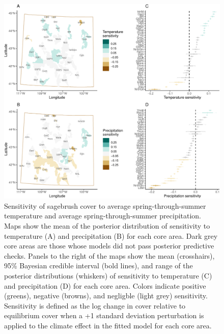 \documentclass[
  12pt,
]{article}
\begin{document}
\begin{figure}
\centering
\includegraphics{sageCastManuscript_files/figure-latex/sensitivities-1.pdf}
\caption{\label{fig:sensitivities}Sensitivity of sagebrush cover to average spring-through-summer temperature and average spring-through-summer precipitation. Maps show the mean of the posterior distribution of sensitivity to temperature (A) and precipitation (B) for each core area. Dark grey core areas are those whose models did not pass posterior predictive checks. Panels to the right of the maps show the mean (crosshairs), 95\% Bayesian credible interval (bold lines), and range of the posterior distributions (whiskers) of sensitivity to temperature (C) and precipitation (D) for each core area. Colors indicate positive (greens), negative (browns), and negligble (light grey) sensitivity. Sensitivity is defined as the log change in cover relative to equilibrium cover when a +1 standard deviation perturbation is applied to the climate effect in the fitted model for each core area.}
\end{figure}
\end{document}
